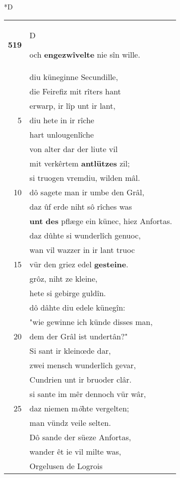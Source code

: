 \documentclass[8pt,a4paper,notitlepage]{article}
\begin{document}
\begin{table}[ht]
\begin{minipage}[t]{0.5\linewidth}
\small
\begin{center}*D
\end{center}
\begin{tabular}{rl}
\textbf{519} & \begin{large}D\end{large}och \textbf{en}\textbf{gezwîvelte} nie sîn wille.\\ 
 & diu küneginne Secundille,\\ 
 & die Feirefiz mit rîters hant\\ 
 & erwarp, ir lîp unt ir lant,\\ 
5 & diu hete in ir rîche\\ 
 & hart unlougenlîche\\ 
 & von alter dar der liute vil\\ 
 & mit verkêrtem \textbf{antlützes} zil;\\ 
 & si truogen vremdiu, wilden mâl.\\ 
10 & dô sagete man ir umbe den Grâl,\\ 
 & daz ûf erde niht sô rîches was\\ 
 & \textbf{unt} \textbf{des} pflæge ein künec, hiez Anfortas.\\ 
 & daz dûhte si wunderlîch genuoc,\\ 
 & wan vil wazzer in ir lant truoc\\ 
15 & vür den griez edel \textbf{gesteine}.\\ 
 & grôz, niht ze kleine,\\ 
 & hete si gebirge guldîn.\\ 
 & dô dâhte diu edele künegîn:\\ 
 & "wie gewinne ich künde disses man,\\ 
20 & dem der Grâl ist undertân?"\\ 
 & Si sant ir kleinœde dar,\\ 
 & zwei mensch wunderlîch gevar,\\ 
 & Cundrien unt ir bruoder clâr.\\ 
 & si sante im mêr dennoch vür wâr,\\ 
25 & daz niemen m\textit{ö}hte vergelten;\\ 
 & man vündz veile selten.\\ 
 & Dô sande der süeze Anfortas,\\ 
 & wander êt ie vil milte was,\\ 
 & Orgelusen de Logrois\\ 

\end{tabular}
\end{minipage}
\end{table}
\end{document}
